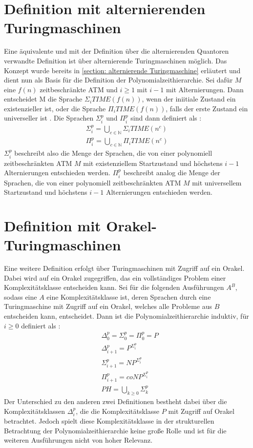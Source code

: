 \section{Definition mit alternierenden Turingmaschinen} \label{section: Definition PH mit ATM}
Eine äquivalente und mit der Definition über die alternierenden Quantoren verwandte Definition ist über alternierende Turingmaschinen möglich.
Das Konzept wurde bereits in \ref{section: alternierende Turingmaschine} erläutert und dient nun als Basis für die Definition der Polynomialzeithierarchie.
Sei dafür $M$ eine $f(n)$ zeitbeschränkte ATM und $i \geq 1$  mit $i - 1$ mit  Alternierungen. Dann entscheidet M die Sprache $\Sigma_i TIME(f(n))$, wenn der iniitiale Zustand ein existenzieller ist,
oder die Sprache $\Pi_i TIME(f(n))$, falls der erste Zustand ein universeller ist \cite{arora_computational_2009}.
Die Sprachen $\Sigma^p_i$ und $\Pi^p_i$ sind dann definiert als \cite{arora_computational_2009}:
\begin{align*}
    \Sigma^p_i = \bigcup_{c \in \mathbb{N}} \Sigma_i TIME(n^c) \\
    \Pi^p_i = \bigcup_{c \in \mathbb{N}} \Pi_i TIME(n^c)
\end{align*}
$\Sigma^p_i$ beschreibt also die Menge der Sprachen, die von einer polynomiell zeitbeschränkten ATM $M$ mit existenziellem Startzustand und höchstens $i-1$ Alternierungen entschieden werden.
$\Pi^p_i$ beschreibt analog die Menge der Sprachen, die von einer polynomiell zeitbeschränkten ATM $M$ mit universellem Startzustand und höchstens $i-1$ Alternierungen entschieden werden.
\section{Definition mit Orakel-Turingmaschinen} \label{section: Definition PH mit Orakel-Turingmaschinen}
Eine weitere Definition erfolgt über Turingmaschinen mit Zugriff auf ein Orakel. Dabei wird auf ein Orakel zugegriffen,
das ein vollständiges Problem einer Komplexitätsklasse entscheiden kann. Sei für die folgenden Ausführungen $A^B$, sodass eine $A$ eine Komplexitätsklasse ist, deren Sprachen durch eine Turingmaschine mit Zugriff auf ein Orakel, welches alle Probleme aus $B$ entscheiden kann, entscheidet. 
Dann ist die Polynomialzeithierarchie induktiv, für $i \geq 0$ definiert als \cite{rothe_komplexitatstheorie_2008}:
\begin{align*}
    & \Delta^p_0 = \Sigma^p_0 = \Pi^p_0 = P \\
    & \Delta^p_{i+1} = P^{\Sigma^p_i} \\
    &\Sigma^p_{i+1} = NP^{\Sigma^p_i} \\
    & \Pi^p_{i+1} = coNP^{\Sigma^p_i} \\
    & PH = \bigcup_{k \geq 0} \Sigma^p_k
\end{align*}
Der Unterschied zu den anderen zwei Definitionen bestheht dabei über die Komplexitätsklassen $\Delta^p_i$, die die Komplexitätsklasse $P$
mit Zugriff auf Orakel betrachtet. Jedoch spielt diese Komplexitätsklasse in der strukturellen Betrachtung der Polynomialzeithierarchie keine große
Rolle und ist für die weiteren Ausführungen nicht von hoher Relevanz.
